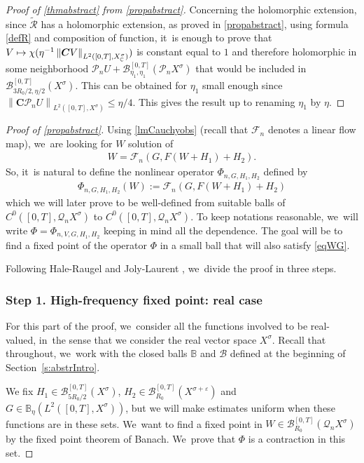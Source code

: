 \documentclass[JEP,XML,SOM,Unicode,published]{cedram}
\newcommand\mto{\mathchoice{\longmapsto}{\mapsto}{\mapsto}{\mapsto}}
\theoremstyle{definition}
\let\mc\mathcal
\let\veps\varepsilon
\newcommand{\B}{\mc{B}}
\newcommand{\Q}{\mathcal{Q}}
\renewcommand{\P}{\mathcal{P}}
\newcommand{\bC}{\boldsymbol{C}}
\newcommand\nor[2]{\left\|#1\right\|_{#2}}
\newcommand\FL{\mathcal{F}_{n}}
\begin{document}
\begin{proof}[Proof of \cref{thmabstract} from \cref{propabstract}]
Concerning the holomorphic extension, since $\mathcal{\widetilde{R}}$ has a holomorphic extension, as proved in \cref{propabstract}, using formula \eqref{defR} and composition of function, it~is enough to prove that $V\mto \chi(\eta^{-1} \nor{\bC V}{L^{2}([0,T],X^{\sigma}_{\mathbb{C}})})$ is constant equal to $1$ and therefore holomorphic in some neighborhood $\P_nU+ \B_{\eta_{1},\eta_{1}}^{[0,T]}(\P_n X^{\sigma})$ that would be included in $\B_{3R_0/2,\eta/2}^{[0,T]}(X^{\sigma})$. This can be obtained for $\eta_{1}$ small enough since $ \nor{\bC \P_n U}{L^{2}([0,T],X^{\sigma})}\leq \eta/4$. This gives the result up to renaming $\eta_{1}$ by $\eta$.
\end{proof}

\begin{proof}[Proof of \cref{propabstract}]
Using \cref{lmCauchyobs} (recall that $\FL$ denotes a linear flow map), we~are looking for $W$ solution of\vspace*{-3pt}
\begin{align*}
W=\FL (G,F(W+H_{1})+H_{2}).
\end{align*}
So, it~is natural to define the nonlinear operator $\Phi_{n,G,H_{1},H_{2}}$ defined by\vspace*{-3pt}
\begin{align}\label{defPhi}
\Phi_{n,G,H_{1},H_{2}}(W):=\FL (G,F(W+H_{1})+H_{2})
\end{align}
which we will later prove to be well-defined from suitable balls of $C^0([0, T], \Q_n X^\sigma)$ to $C^0([0, T], \Q_n X^\sigma)$. To keep notations reasonable, we~will write $\Phi=\Phi_{n,V,G,H_{1},H_{2}}$ keeping in mind all the dependence. The goal will be to find a fixed point of the operator $\Phi$ in a small ball that will also satisfy \eqref{eqWG}.

Following Hale-Raugel \cite[Th.\,2.14]{HR03} and Joly-Laurent \cite[Th.\,10.1]{2020:joly-laurent:decay-nlw-no-gcc}, we~divide the proof in three steps.

\subsubsection*{Step 1. High-frequency fixed point: real case} For this part of the proof, we~consider all the functions involved to be real-valued, in~the sense that we consider the real vector space $X^{\sigma}$. Recall that throughout, we~work with the closed balls $\mathbb{B}$ and $\B$ defined at the beginning of Section~\ref{s:abstrIntro}.

We fix $H_{1}\in \B_{5R_{0}/2}^{[0,T]}(X^{\sigma})$, $H_{2}\in \B_{R_{0}}^{[0,T]}(X^{\sigma+\veps})$ and $G\in \mathbb{B}_{\eta}(L^2([0, T], X^{\sigma}))$, but we will make estimates uniform when these functions are in these sets. We~want to find a fixed point in $W\in \B_{R_{0}}^{[0,T]}(\Q_n X^{\sigma})$ by the fixed point theorem of Banach. We~prove that $\Phi$ is a contraction in this set.


\end{proof}
\end{document}
